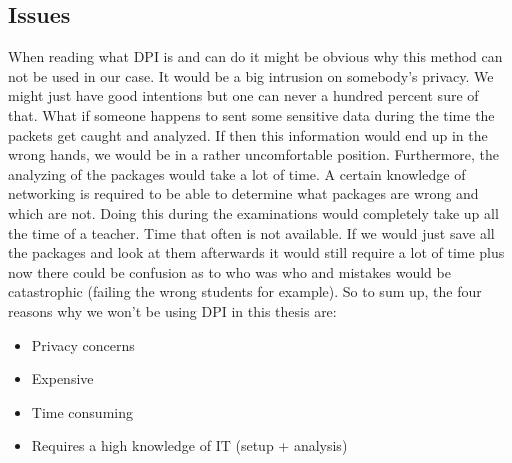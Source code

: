\subsection{Issues}
When reading what DPI is and can do it might be obvious why this method can not be used in our case. It would be a big intrusion on somebody's privacy. We might just have good intentions but one can never a hundred percent sure of that. What if someone happens to sent some sensitive data during the time the packets get caught and analyzed. If then this information would end up in the wrong hands, we would be in a rather uncomfortable position. Furthermore, the analyzing of the packages would take a lot of time. A certain knowledge of networking is required to be able to determine what packages are wrong and which are not. Doing this during the examinations would completely take up all the time of a teacher. Time that often is not available. If we would just save all the packages and look at them afterwards it would still require a lot of time plus now there could be confusion as to who was who and mistakes would be catastrophic (failing the wrong students for example).
So to sum up, the four reasons why we won't be using DPI in this thesis are:
\begin{itemize}
\item Privacy concerns
\item Expensive
\item Time consuming
\item Requires a high knowledge of IT (setup + analysis)
\end{itemize}




